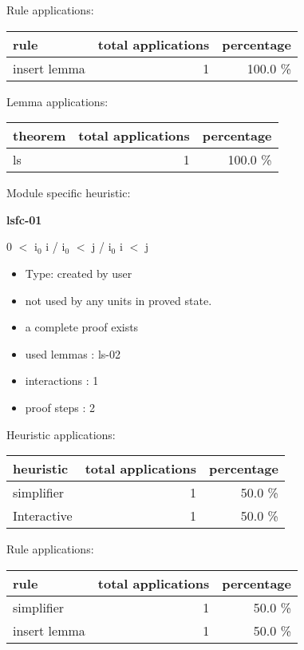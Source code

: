 \documentclass[a4paper]{article}
\begin{document}
Rule applications:

\begin{supertabular}{l|r|r}
rule	        & total applications & percentage \\ \hline
insert lemma & 1 & 100.0 \% \\

\end{supertabular}

Lemma applications:

\begin{supertabular}{l|r|r}
theorem	        & total applications & percentage \\ \hline
ls & 1 & 100.0 \% \\

\end{supertabular}

Module specific heuristic:

\pagebreak

{\LARGE\bf lsfc-01}\label{lemma-lsfc-01}

\medskip

0 $<$ $\mbox{i}_{0}$ \Fol i / $\mbox{i}_{0}$ $<$ j / $\mbox{i}_{0}$ \Imp i $<$ j

\begin{itemize}

\item Type: created by user

\item not used by any units in proved state.
\item       a complete proof exists
\item       used lemmas  : ls-02
\item       interactions : 1
\item       proof steps  : 2
\end{itemize}

\medskip


Heuristic applications:

\begin{supertabular}{l|r|r}
heuristic	& total applications & percentage \\ \hline
simplifier & 1 & 50.0 \% \\
Interactive & 1 & 50.0 \% \\

\end{supertabular}

Rule applications:

\begin{supertabular}{l|r|r}
rule	        & total applications & percentage \\ \hline
simplifier & 1 & 50.0 \% \\
insert lemma & 1 & 50.0 \% \\

\end{supertabular}
\end{document}
